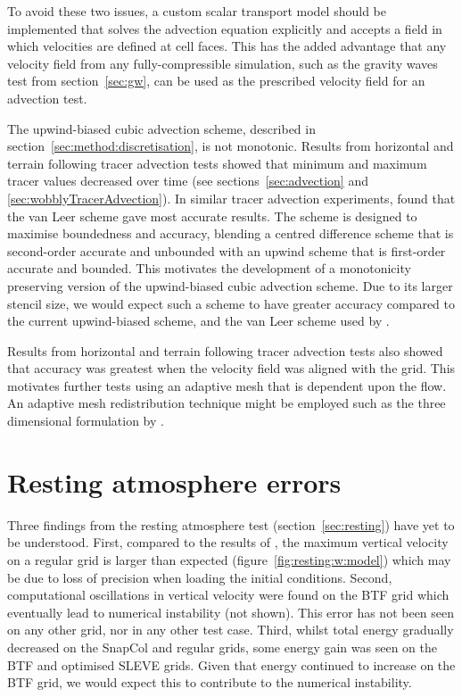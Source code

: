 To avoid these two issues, a custom scalar transport model should be implemented that solves the advection equation explicitly and accepts a field in which velocities are defined at cell faces.  This has the added advantage that any velocity field from any fully-compressible simulation, such as the gravity waves test from section~\ref{sec:gw}, can be used as the prescribed velocity field for an advection test.

The upwind-biased cubic advection scheme, described in section~\ref{sec:method:discretisation}, is not monotonic.  Results from horizontal and terrain following tracer advection tests showed that minimum and maximum tracer values decreased over time (see sections~\ref{sec:advection} and \ref{sec:wobblyTracerAdvection}).
In similar tracer advection experiments, \textcite{jones2013} found that the van Leer scheme gave most accurate results.  The scheme is designed to maximise boundedness and accuracy, blending a centred difference scheme that is second-order accurate and unbounded with an upwind scheme that is first-order accurate and bounded.  This motivates the development of a monotonicity preserving version of the upwind-biased cubic advection scheme.  Due to its larger stencil size, we would expect such a scheme to have greater accuracy compared to the current upwind-biased scheme, and the van Leer scheme used by \textcite{jones2013}.

Results from horizontal and terrain following tracer advection tests also showed that accuracy was greatest when the velocity field was aligned with the grid.  This motivates further tests using an adaptive mesh that is dependent upon the flow.  An adaptive mesh redistribution technique might be employed such as the three dimensional formulation by \textcite{browne2014}.

\section{Resting atmosphere errors}
\label{sec:further-work:resting}

Three findings from the resting atmosphere test (section~\ref{sec:resting}) have yet to be understood.  First, compared to the results of \textcite{good2013}, the maximum vertical velocity on a regular grid is larger than expected (figure~\ref{fig:resting:w:model}) which may be due to loss of precision when loading the initial conditions.
Second, computational oscillations in vertical velocity were found on the BTF grid which eventually lead to numerical instability (not shown).  This error has not been seen on any other grid, nor in any other test case.
Third, whilst total energy gradually decreased on the SnapCol and regular grids, some energy gain was seen on the BTF and optimised SLEVE grids.  Given that energy continued to increase on the BTF grid, we would expect this to contribute to the numerical instability.

